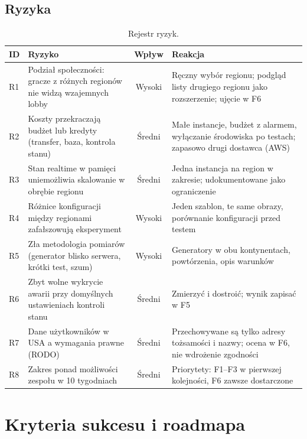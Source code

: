 \section{Ryzyka}
\begin{table}[H]
\centering\footnotesize
\begin{tabularx}{\textwidth}{@{}lYcY@{}}
\toprule
\textbf{ID} & \textbf{Ryzyko} & \textbf{Wpływ} & \textbf{Reakcja} \\
\midrule
R1 & Podział społeczności: gracze z różnych regionów nie widzą wzajemnych lobby & Wysoki & Ręczny wybór regionu; podgląd listy drugiego regionu jako rozszerzenie; ujęcie w F6 \\
R2 & Koszty przekraczają budżet lub kredyty (transfer, baza, kontrola stanu) & Średni & Małe instancje, budżet z alarmem, wyłączanie środowiska po testach; zapasowo drugi dostawca (AWS) \\
R3 & Stan realtime w pamięci uniemożliwia skalowanie w obrębie regionu & Średni & Jedna instancja na region w zakresie; udokumentowane jako ograniczenie \\
R4 & Różnice konfiguracji między regionami zafałszowują eksperyment & Wysoki & Jeden szablon, te same obrazy, porównanie konfiguracji przed testem \\
R5 & Zła metodologia pomiarów (generator blisko serwera, krótki test, szum) & Wysoki & Generatory w obu kontynentach, powtórzenia, opis warunków \\
R6 & Zbyt wolne wykrycie awarii przy domyślnych ustawieniach kontroli stanu & Średni & Zmierzyć i dostroić; wynik zapisać w F5 \\
R7 & Dane użytkowników w USA a wymagania prawne (RODO) & Średni & Przechowywane są tylko adresy tożsamości i nazwy; ocena w F6, nie wdrożenie zgodności \\
R8 & Zakres ponad możliwości zespołu w 10 tygodniach & Średni & Priorytety: F1--F3 w pierwszej kolejności, F6 zawsze dostarczone \\
\bottomrule
\end{tabularx}
\caption{Rejestr ryzyk.}
\end{table}

\chapter{Kryteria sukcesu i roadmapa}
\label{ch:wizja-sukces}

